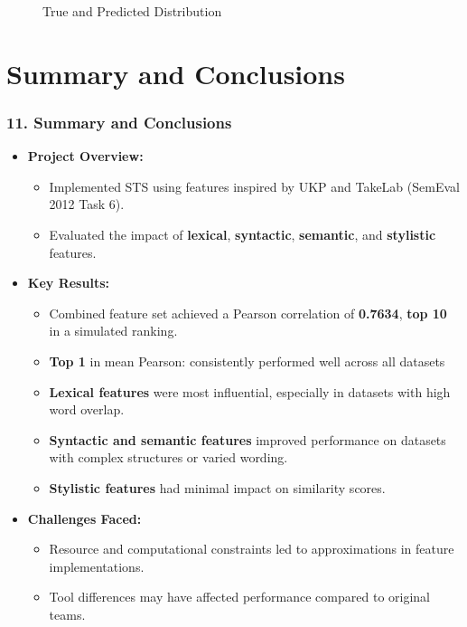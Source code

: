 \documentclass{beamer}
\begin{document}
\begin{frame}
\begin{figure}
\begin{minipage}{0.5\linewidth}
      \caption{True and Predicted Distribution}
    \end{minipage}
  \end{figure}
\end{frame}


\section{Summary and Conclusions}

\begin{frame}[allowframebreaks]
  \frametitle{11. Summary and Conclusions}
  \begin{itemize}
    \item \textbf{Project Overview:}
    \begin{itemize}
      \item Implemented STS using features inspired by UKP\cite{bar-etal-2012-ukp} and TakeLab\cite{saric-etal-2012-takelab} (SemEval 2012 Task 6).
      \item Evaluated the impact of \textbf{lexical}, \textbf{syntactic}, \textbf{semantic}, and \textbf{stylistic} features.
    \end{itemize}
    \vspace{0.3cm}
    \item \textbf{Key Results:}
    \begin{itemize}
      \item Combined feature set achieved a Pearson correlation of \textbf{0.7634}, \textbf{top 10} in a simulated ranking.
      \item \textbf{Top 1} in mean Pearson: consistently performed well across all datasets
      \item \textbf{Lexical features} were most influential, especially in datasets with high word overlap.
      \item \textbf{Syntactic and semantic features} improved performance on datasets with complex structures or varied wording.
      \item \textbf{Stylistic features} had minimal impact on similarity scores.
    \end{itemize}
    \vspace{20cm}
    \item \textbf{Challenges Faced:}
    \begin{itemize}
      \item Resource and computational constraints led to approximations in feature implementations.
      \item Tool differences may have affected performance compared to original teams.

\end{itemize}
\end{itemize}
\end{frame}
\end{document}
